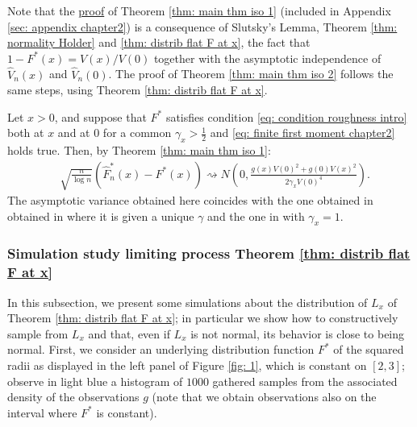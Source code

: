 Note that the \hyperlink{proof of main thm}{proof} of Theorem \ref{thm: main thm iso 1} (included in Appendix \ref{sec: appendix chapter2}) is a consequence of Slutsky's Lemma, Theorem \ref{thm: normality Holder} and \ref{thm: distrib flat F at x}, the fact that $1 - F^*(x) = V(x)/V(0)$ together with the asymptotic independence of $\hat{V}_n(x)$ and $\hat{V}_n(0)$. The proof of Theorem \ref{thm: main thm iso 2} follows the same steps, using Theorem \ref{thm: distrib flat F at x}.

\begin{remark}
Let $x>0$, and suppose that $F^*$ satisfies condition \eqref{eq: condition roughness intro} both at $x$ and at 0 for a common $\gamma_x> \frac{1}{2}$ and \eqref{eq: finite first moment chapter2} holds true. Then, by Theorem \ref{thm: main thm iso 1}:
\begin{align}
& \sqrt{\frac{n}{\log n}}\left( \hat{F}^*_n(x) -F^*(x)\right) \rightsquigarrow N\left(0, \frac{g(x) V(0)^2+g(0) V(x)^2}{2 \gamma_xV(0)^4}\right).
\end{align}
The asymptotic variance obtained here coincides with the one obtained in obtained in \cite{10} where it is given a unique $\gamma$ and the one in \cite{1} with $\gamma_x= 1$. 
\end{remark}

\subsubsection*{Simulation study limiting process Theorem \ref{thm: distrib flat F at x}}

In this subsection, we present some simulations about the distribution of $L_x$ of Theorem \ref{thm: distrib flat F at x}; in particular we show how to constructively sample from $L_x$ and that, even if $L_x$ is not normal, its behavior is close to being normal.
First, we consider an underlying distribution function $F^*$ of the squared radii as displayed in the left panel of Figure \ref{fig: 1}, which is constant on $[2,3]$; observe in light blue a histogram of $1000$ gathered samples from the associated density of the observations $g$ (note that we obtain observations also on the interval where $F^*$ is constant).


